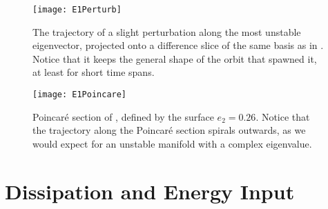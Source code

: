 \begin{figure}[h!]
\centerline{\texttt{[image: E1Perturb]}}
\caption{The trajectory of a slight perturbation along the most unstable eigenvector, projected onto a difference slice of the same basis as in . Notice that it keeps the general shape of the orbit that spawned it, at least for short time spans.}\label{fig:p8E1}
\end{figure}

\begin{figure}[h!]
\centerline{\texttt{[image: E1Poincare]}}
\caption{Poincaré section of , defined by the surface $e_2 = 0.26$. Notice that the trajectory along the Poincaré section spirals outwards, as we would expect for an unstable manifold with a complex eigenvalue.}\label{fig:E1Poincare}
\end{figure}

\section{Dissipation and Energy Input} 
  
